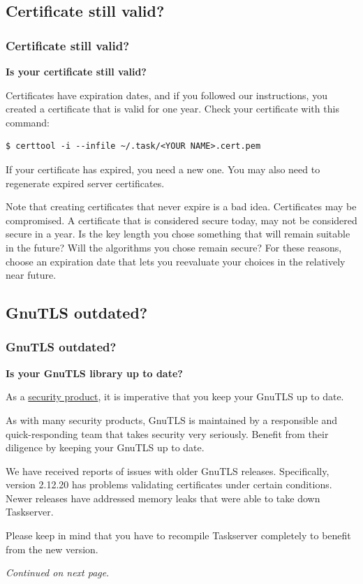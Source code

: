 \documentclass[t,handout]{beamer}
\begin{document}
\subsection{Certificate still valid?}

\begin{frame}[fragile]\frametitle{Certificate still valid?}
    \vfill
    \textbf{Is your certificate still valid?}

    Certificates have expiration dates, and if you followed our instructions, you created a certificate that is valid for one year.  Check your certificate with this command:

    \begin{lstlisting}
$ certtool -i --infile ~/.task/<YOUR NAME>.cert.pem\end{lstlisting}

    If your certificate has expired, you need a new one.  You may also need to regenerate expired server certificates.

    Note that creating certificates that never expire is a bad idea. Certificates may be compromised. A certificate that is considered secure today, may not be considered secure in a year. Is the key length you chose something that will remain suitable in the future? Will the algorithms you          chose remain secure? For these reasons, choose an expiration date that lets you reevaluate your choices in the relatively near future.
\end{frame}

\subsection{GnuTLS outdated?}

\begin{frame}[fragile]\frametitle{GnuTLS outdated?}\label{gnutlsproblem}
    \vfill
    \textbf{Is your GnuTLS library up to date?}

    As a \href{http://gnutls.org/security.html}{security product}, it is imperative that you keep your GnuTLS up to date.

    As with many security products, GnuTLS is maintained by a responsible and quick-responding team that takes security very seriously.  Benefit from their diligence by keeping your GnuTLS up to date.

    We have received reports of issues with older GnuTLS releases. Specifically, version 2.12.20 has problems validating certificates under certain conditions. Newer releases have addressed memory leaks that were able to take down Taskserver.

    Please keep in mind that you have to recompile Taskserver completely to benefit from the new version.

    \emph{Continued on next page}.
\end{frame}
\end{document}
